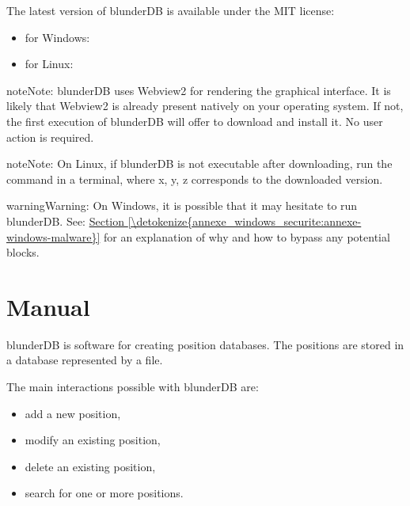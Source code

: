 \documentclass[letterpaper,10pt,english]{sphinxmanual}
\begin{document}
\sphinxAtStartPar
The latest version of blunderDB is available under the MIT license:
\begin{itemize}
\item {} 
\sphinxAtStartPar
for Windows: 

\item {} 
\sphinxAtStartPar
for Linux: 

\end{itemize}

\begin{sphinxadmonition}{note}{Note:}
\sphinxAtStartPar
blunderDB uses Webview2 for rendering the graphical interface. It is likely that Webview2 is already present natively on your operating system. If not, the first execution of blunderDB will offer to download and install it. No user action is required.
\end{sphinxadmonition}

\begin{sphinxadmonition}{note}{Note:}
\sphinxAtStartPar
On Linux, if blunderDB is not executable after downloading, run the command  in a terminal, where x, y, z corresponds to the downloaded version.
\end{sphinxadmonition}

\begin{sphinxadmonition}{warning}{Warning:}
\sphinxAtStartPar
On Windows, it is possible that it may hesitate to run blunderDB. See: \hyperref[\detokenize{annexe_windows_securite:annexe-windows-malware}]{Section \ref{\detokenize{annexe_windows_securite:annexe-windows-malware}}} for an explanation of why and how to bypass any potential blocks.
\end{sphinxadmonition}

\sphinxstepscope


\section{Manual}
\label{\detokenize{manuel:manuel}}\label{\detokenize{manuel:id1}}\label{\detokenize{manuel::doc}}
\sphinxAtStartPar
blunderDB is software for creating position databases. The positions are stored in a database represented by a  file.

\sphinxAtStartPar
The main interactions possible with blunderDB are:
\begin{itemize}
\item {} 
\sphinxAtStartPar
add a new position,

\item {} 
\sphinxAtStartPar
modify an existing position,

\item {} 
\sphinxAtStartPar
delete an existing position,

\item {} 
\sphinxAtStartPar
search for one or more positions.

\end{itemize}
\end{document}
